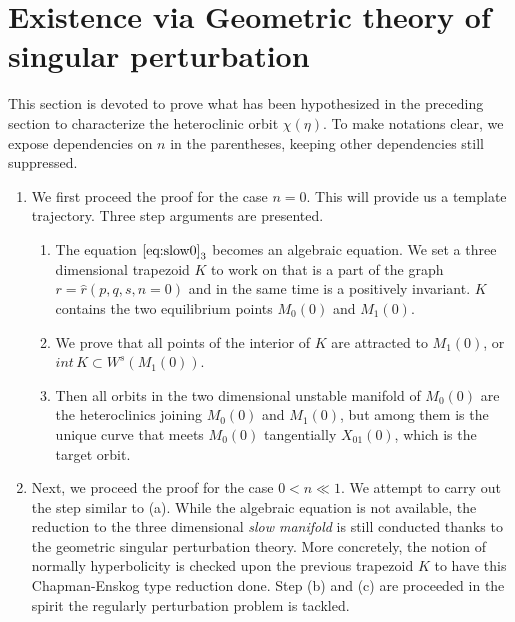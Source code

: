 \documentclass[a4paper,11pt]{article}
\def\blue{\color{blue}}
\begin{document}
{\blue
\section{Existence via Geometric theory of singular perturbation} \label{sec:proof}
This section is devoted to prove what has been hypothesized in the preceding section to characterize the heteroclinic orbit $\chi(\eta)$. To make notations clear, we expose dependencies on $n$ in the parentheses, keeping other dependencies still suppressed.
\begin{enumerate}
 \item We first proceed the proof for the case $n=0$. This will provide us a template trajectory. Three step arguments are presented.
 \begin{enumerate}
 \item The equation $\eqref{eq:slow0}_3$ becomes an algebraic equation. We set a three dimensional trapezoid $K$ to work on that is a part of the graph $r=\hat{r}(p,q,s,n=0)$ and in the same time is a positively invariant. $K$ contains the two equilibrium points $M_0(0)$ and $M_1(0)$.
 \item We prove that all points of the interior of $K$ are attracted to $M_1(0)$, or $int\, K \subset W^s(M_1(0))$.
 \item Then all orbits in the two dimensional unstable manifold of $M_0(0)$ are the heteroclinics joining $M_0(0)$ and $M_1(0)$, but among them is the unique curve that meets $M_0(0)$ tangentially $X_{01}(0)$, which is the target orbit.
 \end{enumerate}
 \item Next, we proceed the proof for the case $0<n\ll1$. We attempt to carry out the step similar to (a). While the algebraic equation is not available, the reduction to the three dimensional {\it slow manifold} is still conducted thanks to the geometric singular perturbation theory. More concretely, the notion of normally hyperbolicity is checked upon the previous trapezoid $K$ to have this Chapman-Enskog type reduction done. Step (b) and (c) are proceeded in the spirit the regularly perturbation problem is tackled.
\end{enumerate}

}
\end{document}
